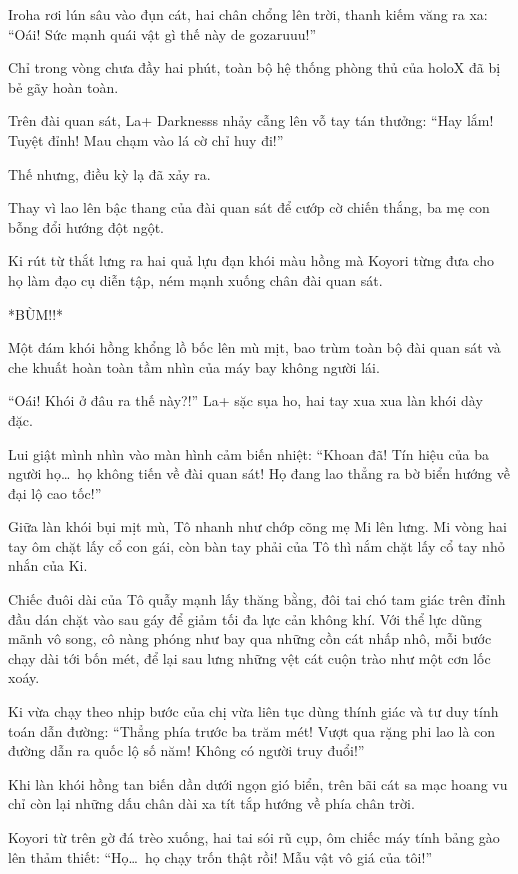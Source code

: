 \documentclass[../main.tex]{subfiles}
\begin{document}
Iroha rơi lún sâu vào đụn cát, hai chân chổng lên trời, thanh kiếm văng ra xa: ``Oái! Sức mạnh quái vật gì thế này de gozaruuu!''

Chỉ trong vòng chưa đầy hai phút, toàn bộ hệ thống phòng thủ của holoX đã bị bẻ gãy hoàn toàn.

Trên đài quan sát, La+ Darknesss nhảy cẫng lên vỗ tay tán thưởng: ``Hay lắm! Tuyệt đỉnh! Mau chạm vào lá cờ chỉ huy đi!''

Thế nhưng, điều kỳ lạ đã xảy ra.

Thay vì lao lên bậc thang của đài quan sát để cướp cờ chiến thắng, ba mẹ con bỗng đổi hướng đột ngột.

Ki rút từ thắt lưng ra hai quả lựu đạn khói màu hồng mà Koyori từng đưa cho họ làm đạo cụ diễn tập, ném mạnh xuống chân đài quan sát.

*BÙM!!*

Một đám khói hồng khổng lồ bốc lên mù mịt, bao trùm toàn bộ đài quan sát và che khuất hoàn toàn tầm nhìn của máy bay không người lái.

``Oái! Khói ở đâu ra thế này?!'' La+ sặc sụa ho, hai tay xua xua làn khói dày đặc.

Lui giật mình nhìn vào màn hình cảm biến nhiệt: ``Khoan đã! Tín hiệu của ba người họ\dots\ họ không tiến về đài quan sát! Họ đang lao thẳng ra bờ biển hướng về đại lộ cao tốc!''

Giữa làn khói bụi mịt mù, Tô nhanh như chớp cõng mẹ Mi lên lưng. Mi vòng hai tay ôm chặt lấy cổ con gái, còn bàn tay phải của Tô thì nắm chặt lấy cổ tay nhỏ nhắn của Ki.

Chiếc đuôi dài của Tô quẫy mạnh lấy thăng bằng, đôi tai chó tam giác trên đỉnh đầu dán chặt vào sau gáy để giảm tối đa lực cản không khí. Với thể lực dũng mãnh vô song, cô nàng phóng như bay qua những cồn cát nhấp nhô, mỗi bước chạy dài tới bốn mét, để lại sau lưng những vệt cát cuộn trào như một cơn lốc xoáy.

Ki vừa chạy theo nhịp bước của chị vừa liên tục dùng thính giác và tư duy tính toán dẫn đường: ``Thẳng phía trước ba trăm mét! Vượt qua rặng phi lao là con đường dẫn ra quốc lộ số năm! Không có người truy đuổi!''

Khi làn khói hồng tan biến dần dưới ngọn gió biển, trên bãi cát sa mạc hoang vu chỉ còn lại những dấu chân dài xa tít tắp hướng về phía chân trời.

Koyori từ trên gờ đá trèo xuống, hai tai sói rũ cụp, ôm chiếc máy tính bảng gào lên thảm thiết: ``Họ\dots\ họ chạy trốn thật rồi! Mẫu vật vô giá của tôi!''
\end{document}
